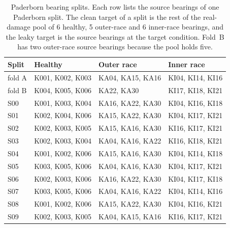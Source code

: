 \begin{table}[htbp]
\centering
\begingroup
\small
\setlength{\tabcolsep}{4pt}
\begin{tabular}{llll}
\toprule
Split & Healthy & Outer race & Inner race \\
\midrule
fold A & K001, K002, K003 & KA04, KA15, KA16 & KI04, KI14, KI16 \\
fold B & K004, K005, K006 & KA22, KA30 & KI17, KI18, KI21 \\
\midrule
S00 & K001, K003, K004 & KA16, KA22, KA30 & KI04, KI16, KI18 \\
S01 & K002, K004, K006 & KA15, KA22, KA30 & KI04, KI17, KI21 \\
S02 & K002, K003, K005 & KA15, KA16, KA30 & KI16, KI17, KI21 \\
S03 & K002, K003, K004 & KA04, KA16, KA22 & KI16, KI18, KI21 \\
S04 & K001, K002, K006 & KA15, KA16, KA30 & KI04, KI14, KI18 \\
S05 & K003, K005, K006 & KA04, KA16, KA30 & KI04, KI17, KI21 \\
S06 & K002, K003, K006 & KA16, KA22, KA30 & KI04, KI17, KI18 \\
S07 & K003, K005, K006 & KA04, KA16, KA22 & KI04, KI14, KI16 \\
S08 & K001, K002, K006 & KA15, KA22, KA30 & KI04, KI16, KI21 \\
S09 & K002, K003, K005 & KA04, KA15, KA16 & KI16, KI17, KI21 \\
\bottomrule
\end{tabular}\par
\endgroup
\caption{Paderborn bearing splits. Each row lists the source bearings of one Paderborn split. The clean target of a split is the rest of the real-damage pool of 6 healthy, 5 outer-race and 6 inner-race bearings, and the leaky target is the source bearings at the target condition. Fold~B has two outer-race source bearings because the pool holds five.}
\label{tab:splits}
\end{table}
